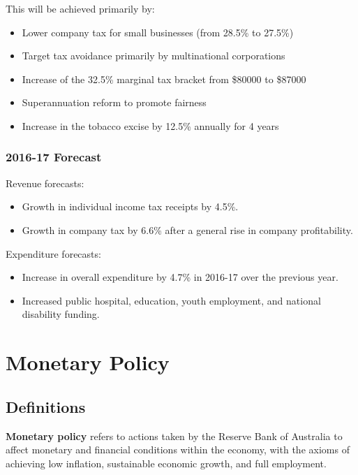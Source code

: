 \documentclass[a4paper,11pt]{report}
\begin{document}
This will be achieved primarily by:

\begin{itemize}
\item Lower company tax for small businesses (from 28.5\% to 27.5\%)
\item Target tax avoidance primarily by multinational corporations
\item Increase of the 32.5\% marginal tax bracket from \$80000 to \$87000
\item Superannuation reform to promote fairness
\item Increase in the tobacco excise by 12.5\% annually for 4 years
\end{itemize}

\subsection{2016-17 Forecast}

Revenue forecasts:

\begin{itemize}
\item Growth in individual income tax receipts by 4.5\%.
\item Growth in company tax by 6.6\% after a general rise in company
	profitability.
\end{itemize}

Expenditure forecasts:

\begin{itemize}
\item Increase in overall expenditure by 4.7\% in 2016-17 over the previous
	year.
\item Increased public hospital, education, youth employment, and national
	disability funding.
\end{itemize}




\chapter{Monetary Policy}

\section{Definitions}

\textbf{Monetary policy} refers to actions taken by the Reserve Bank of
Australia to affect monetary and financial conditions within the economy, with
the axioms of achieving low inflation, sustainable economic growth, and full
employment.
\end{document}
